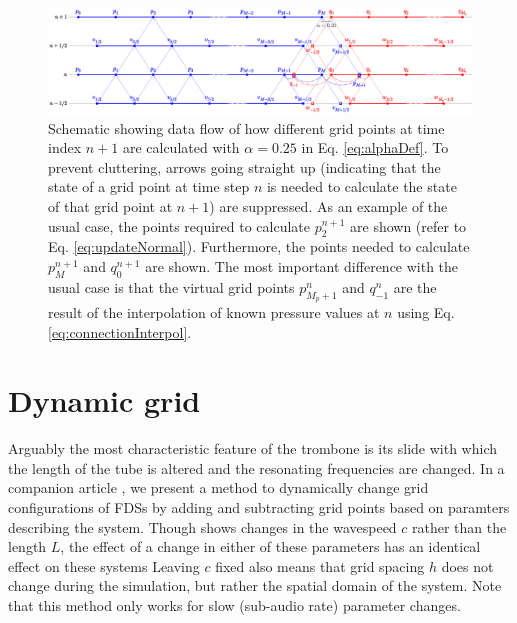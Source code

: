 \begin{figure}[t]
    \centering
    \includegraphics[width = \textwidth]{Figures/tromboneSchematic.eps}
    \caption{Schematic showing data flow of how different grid points at time index $n+1$ are calculated with $\alpha = 0.25$ in Eq. \eqref{eq:alphaDef}. To prevent cluttering, arrows going straight up (indicating that the state of a grid point at time step $n$ is needed to calculate the state of that grid point at $n+1$) are suppressed. As an example of the usual case, the points required to calculate $p_2^{n+1}$ are shown (refer to Eq. \eqref{eq:updateNormal}). Furthermore, the points needed to calculate $p_{M}^{n+1}$ and $q_0^{n+1}$ are shown. The most important difference with the usual case is that the virtual grid points $p_{M_p+1}^n$ and $q_{-1}^n$ 
    are the result of the interpolation of known pressure values at $n$ using Eq. \eqref{eq:connectionInterpol}. %
    \label{fig:dynamicGridSchematic}}
\end{figure}

\section{Dynamic grid}\label{sec:dynamicGrid}
Arguably the most characteristic feature of the trombone is its slide with which the length of the tube is altered and the resonating frequencies are changed. In a companion article \cite{Willemsen2021}, we present a method to dynamically change grid configurations of FDSs by adding and subtracting grid points based on paramters describing the system. Though \cite{Willemsen2021} shows changes in the wavespeed $c$ rather than the length $L$, the effect of a change in either of these parameters has an identical effect on these systems  Leaving $c$ fixed also means that grid spacing $h$ does not change during the simulation, but rather the spatial domain of the system. Note that this method only works for slow (sub-audio rate) parameter changes.


